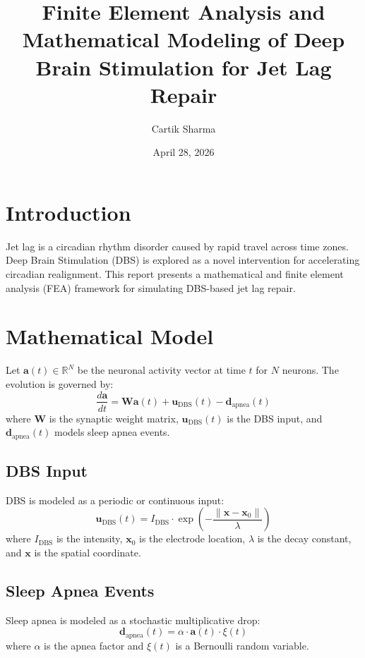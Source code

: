 \documentclass{article}
\title{Finite Element Analysis and Mathematical Modeling of Deep Brain Stimulation for Jet Lag Repair}
\author{Cartik Sharma}
\date{April 28, 2026}
\begin{document}
\maketitle

\section{Introduction}
Jet lag is a circadian rhythm disorder caused by rapid travel across time zones. Deep Brain Stimulation (DBS) is explored as a novel intervention for accelerating circadian realignment. This report presents a mathematical and finite element analysis (FEA) framework for simulating DBS-based jet lag repair.

\section{Mathematical Model}
Let $\mathbf{a}(t) \in \mathbb{R}^N$ be the neuronal activity vector at time $t$ for $N$ neurons. The evolution is governed by:
\begin{equation}
\frac{d\mathbf{a}}{dt} = \mathbf{W} \mathbf{a}(t) + \mathbf{u}_{\text{DBS}}(t) - \mathbf{d}_{\text{apnea}}(t)
\end{equation}
where $\mathbf{W}$ is the synaptic weight matrix, $\mathbf{u}_{\text{DBS}}(t)$ is the DBS input, and $\mathbf{d}_{\text{apnea}}(t)$ models sleep apnea events.

\subsection{DBS Input}
DBS is modeled as a periodic or continuous input:
\begin{equation}
\mathbf{u}_{\text{DBS}}(t) = I_{\text{DBS}} \cdot \exp\left(-\frac{\|\mathbf{x} - \mathbf{x}_0\|}{\lambda}\right)
\end{equation}
where $I_{\text{DBS}}$ is the intensity, $\mathbf{x}_0$ is the electrode location, $\lambda$ is the decay constant, and $\mathbf{x}$ is the spatial coordinate.

\subsection{Sleep Apnea Events}
Sleep apnea is modeled as a stochastic multiplicative drop:
\begin{equation}
\mathbf{d}_{\text{apnea}}(t) = \alpha \cdot \mathbf{a}(t) \cdot \xi(t)
\end{equation}
where $\alpha$ is the apnea factor and $\xi(t)$ is a Bernoulli random variable.
\end{document}
